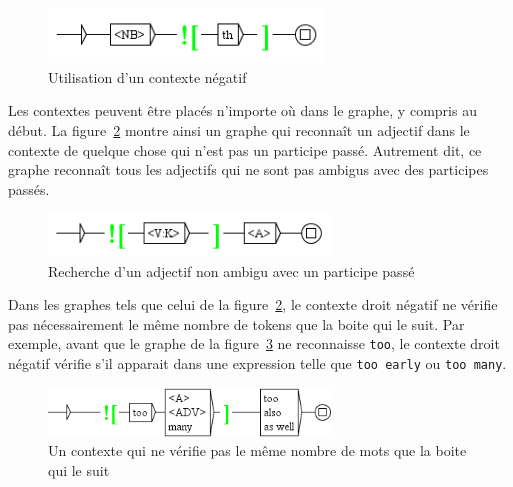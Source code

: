 \begin{figure}[!ht]
\begin{center}
\includegraphics[width=7.3cm]{resources/img/fig6-13.png}
\caption{Utilisation d’un contexte négatif\label{fig-context2}}
\end{center}
\end{figure}

\bigskip
\noindent Les contextes peuvent être placés n’importe où dans le graphe, y compris au début. La
figure~\ref{fig-context3} montre ainsi un graphe qui reconnaît un adjectif dans le contexte de
quelque
chose qui n’est pas un participe passé. Autrement dit, ce graphe reconnaît tous les adjectifs
qui ne sont pas ambigus avec des participes passés.

\begin{figure}[!ht]
\begin{center}
\includegraphics[width=7.5cm]{resources/img/fig6-14.png}
\caption{Recherche d’un adjectif non ambigu avec un participe passé\label{fig-context3}}
\end{center}
\end{figure}

\bigskip
\noindent Dans les graphes tels que celui de la figure~\ref{fig-context3}, le contexte droit négatif
ne vérifie pas nécessairement le même nombre de tokens que la boite qui le suit. Par exemple, avant
que le graphe de la figure~\ref{too-also} ne reconnaisse \verb+too+, le contexte droit négatif
vérifie s'il apparait dans une expression telle que \verb+too early+ ou \verb+too many+.

\begin{figure}[!ht]
\begin{center}
\includegraphics[width=7.5cm]{resources/img/fig-too-also.png}
\caption{Un contexte qui ne vérifie pas le même nombre de mots que la boite qui le suit\label{too-also}}
\end{center}
\end{figure}

